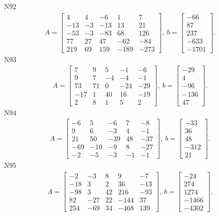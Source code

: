 \documentclass[11pt]{report}
\begin{document}
N92
\begin{align*}
 A = \left[\begin{matrix}4 & 4 & -6 & 1 & 7\\-13 & -3 & -13 & 13 & 21\\-53 & -3 & -83 & 68 & 126\\77 & 27 & 47 & -62 & -84\\219 & 69 & 159 & -189 & -273\end{matrix}\right],
\ b = \left[\begin{matrix}-66\\87\\237\\-633\\-1701\end{matrix}\right]. 
 \end{align*}
N93
\begin{align*}
 A = \left[\begin{matrix}7 & 9 & 5 & -1 & -6\\9 & 7 & -4 & -4 & -1\\73 & 71 & 0 & -24 & -29\\-17 & 1 & 40 & 16 & -19\\2 & 8 & 1 & 5 & 2\end{matrix}\right],
\ b = \left[\begin{matrix}-29\\4\\-96\\-136\\47\end{matrix}\right]. 
 \end{align*}
N94
\begin{align*}
 A = \left[\begin{matrix}-6 & 5 & -6 & 7 & -8\\9 & 6 & -3 & 4 & -1\\21 & 50 & -39 & 48 & -37\\-69 & -10 & -9 & 8 & -27\\-2 & -5 & -3 & -1 & -1\end{matrix}\right],
\ b = \left[\begin{matrix}-33\\36\\48\\-312\\21\end{matrix}\right]. 
 \end{align*}
N95
\begin{align*}
 A = \left[\begin{matrix}-2 & -3 & 8 & 9 & -7\\-18 & 3 & 2 & 36 & -13\\-98 & 3 & 42 & 216 & -93\\82 & -27 & 22 & -144 & 37\\254 & -69 & 34 & -468 & 139\end{matrix}\right],
\ b = \left[\begin{matrix}-24\\274\\1274\\-1466\\-4302\end{matrix}\right]. 
 \end{align*}
\end{document}
